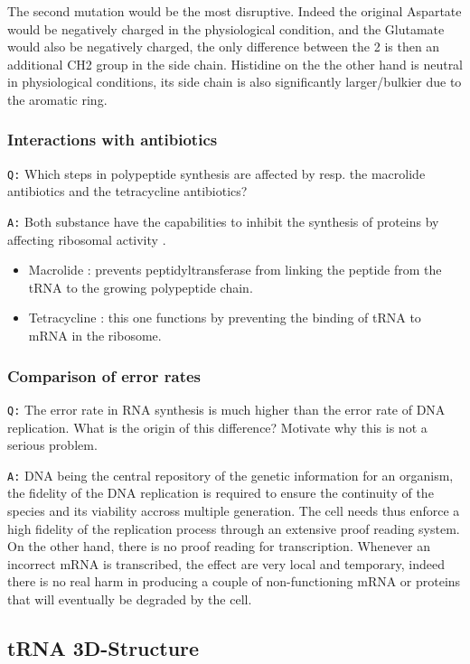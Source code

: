 \documentclass[11pt, a4paper,titlepage]{article}
\begin{document}
The second mutation would be the most disruptive. Indeed the original
Aspartate would be negatively charged in the physiological condition,
and the Glutamate would also be negatively charged, the only
difference between the 2 is then an additional CH2 group in the side
chain. Histidine on the the other hand is neutral in physiological
conditions, its side chain is also significantly larger/bulkier due to
the aromatic ring.
\subsubsection{Interactions with antibiotics}
\label{sec-1-2-4}

\texttt{Q:} Which steps in polypeptide synthesis are affected by resp. the
macrolide antibiotics and the tetracycline antibiotics?

\texttt{A:} Both substance have the capabilities to inhibit the synthesis of
proteins by affecting ribosomal activity \cite{AntibioticsRibosomeEffect}. 

\begin{itemize}
\item Macrolide : prevents peptidyltransferase from linking the peptide
  from the tRNA to the growing polypeptide chain.
\item Tetracycline : this one functions by preventing the binding of tRNA
  to mRNA in the ribosome.
\end{itemize}
\subsubsection{Comparison of error rates}
\label{sec-1-2-5}

\texttt{Q:} The error rate in RNA synthesis is much higher than the error rate
of DNA replication. What is the origin of this difference? Motivate
why this is not a serious problem.

\texttt{A:} DNA being the central repository of the genetic information for
an organism, the fidelity of the DNA replication is required to ensure
the continuity of the species and its viability accross multiple
generation. The cell needs thus enforce a high fidelity of the
replication process through an extensive proof reading system. On the
other hand, there is no proof reading for transcription. Whenever an
incorrect mRNA is transcribed, the effect are very local and
temporary, indeed there is no real harm in producing a couple of
non-functioning mRNA or proteins that will eventually be degraded by
the cell.
\subsection{tRNA 3D-Structure}
\label{sec-1-3}
\end{document}
